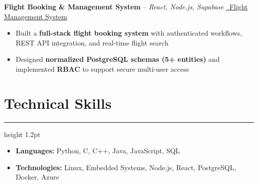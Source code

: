 \documentclass[11pt]{article}
\newcommand{\divider}{\hrule height 1.2pt \vspace{6pt}}
\begin{document}
    \textbf{Flight Booking \& Management System} – \textit{React, Node.js, Supabase} \hfill \href{https://github.com/daudk3/flight-management-system}{\faGithub\ Flight Management System}\\
        \begin{itemize}
        \item Built a \textbf{full-stack flight booking system} with authenticated workflows, REST API integration, and real-time flight search
        \item Designed \textbf{normalized PostgreSQL schemas (5+ entities)} and implemented \textbf{RBAC} to support secure multi-user access
    \end{itemize}
        
	\section{Technical Skills}
    \divider
    \begin{itemize}
        \item \textbf{Languages:} Python, C, C++, Java, JavaScript, SQL \\
        \item \textbf{Technologies:} Linux, Embedded Systems, Node.js, React, PostgreSQL, Docker, Azure \\
    \end{itemize}
\end{document}
